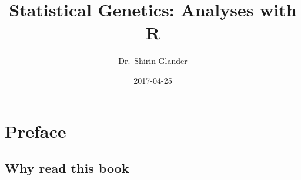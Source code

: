 \documentclass[12pt,]{krantz}
\title{Statistical Genetics: Analyses with R}
\author{Dr.~Shirin Glander}
\date{2017-04-25}
\begin{document}
\maketitle

\thispagestyle{empty}

\setlength{\abovedisplayskip}{-5pt}
\setlength{\abovedisplayshortskip}{-5pt}

{
\hypersetup{linkcolor=black}
\setcounter{tocdepth}{1}
\tableofcontents
}
\listoftables
\listoffigures
\chapter*{Preface}\label{preface}


\section*{Why read this book}\label{why-read-this-book}
\end{document}
